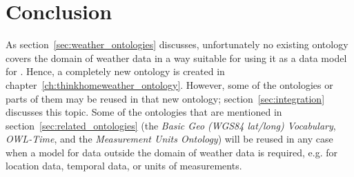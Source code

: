 \section{Conclusion}

As section~\ref{sec:weather_ontologies} discusses, unfortunately no existing ontology covers the domain of weather data in a way suitable for using it as a data model for \thinkhome. Hence, a completely new ontology is created in chapter~\ref{ch:thinkhomeweather_ontology}. However, some of the ontologies or parts of them may be reused in that new ontology; section~\ref{sec:integration} discusses this topic. Some of the ontologies that are mentioned in section~\ref{sec:related_ontologies} (the \emph{Basic Geo (WGS84 lat/long) Vocabulary}, \emph{OWL-Time}, and the \emph{Measurement Units Ontology}) will be reused in any case when a model for data outside the domain of weather data is required, e.g. for location data, temporal data, or units of measurements.
